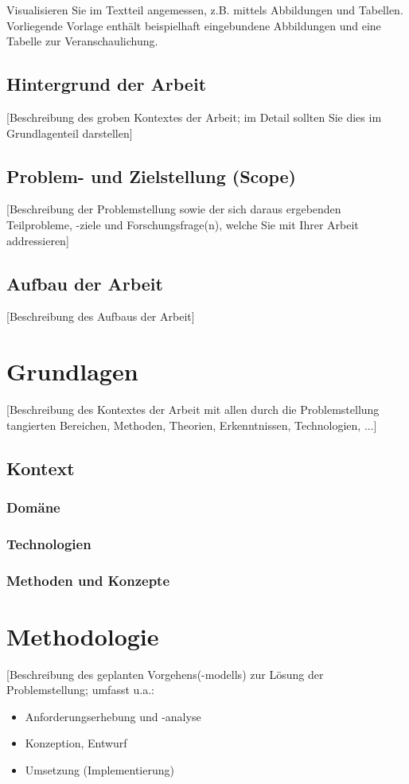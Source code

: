 \documentclass[oneside,bibliography=totocnumbered,BCOR=5mm]{scrbook}
\begin{document}
Visualisieren Sie im Textteil angemessen, z.B. mittels Abbildungen und Tabellen. \\
Vorliegende Vorlage enthält beispielhaft eingebundene Abbildungen und eine Tabelle zur Veranschaulichung.

\section{Hintergrund der Arbeit}
[Beschreibung des groben Kontextes der Arbeit; im Detail sollten Sie dies im Grundlagenteil darstellen]

\section{Problem- und Zielstellung (Scope)}
[Beschreibung der Problemstellung sowie der sich daraus ergebenden Teilprobleme, -ziele und Forschungsfrage(n), welche Sie mit Ihrer Arbeit addressieren]

\section{Aufbau der Arbeit}
[Beschreibung des Aufbaus der Arbeit]

\chapter{Grundlagen}
[Beschreibung des Kontextes der Arbeit mit allen durch die Problemstellung tangierten Bereichen, Methoden, Theorien, Erkenntnissen, Technologien, ...]

\section{Kontext}

\subsection{Domäne}

\subsection{Technologien}

\subsection{Methoden und Konzepte}

\chapter{Methodologie}
[Beschreibung des geplanten Vorgehens(-modells) zur Lösung der Problemstellung; umfasst u.a.:
\begin{itemize}
\item Anforderungserhebung und -analyse
\item Konzeption, Entwurf
\item Umsetzung (Implementierung)
\end{itemize}
\end{document}

